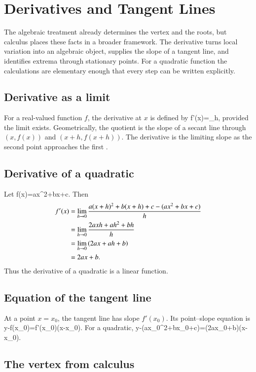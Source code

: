 \section{Derivatives and Tangent Lines}

The algebraic treatment already determines the vertex and the roots, but calculus places these facts in a broader framework. The derivative turns local variation into an algebraic object, supplies the slope of a tangent line, and identifies extrema through stationary points. For a quadratic function the calculations are elementary enough that every step can be written explicitly.

\subsection{Derivative as a limit}

For a real-valued function $f$, the derivative at $x$ is defined by
\be
f'(x)=\lim_{h},
\ee
provided the limit exists. Geometrically, the quotient is the slope of a secant line through $(x,f(x))$ and $(x+h,f(x+h))$. The derivative is the limiting slope as the second point approaches the first \cite{apostol1967,spivak2008}.

\subsection{Derivative of a quadratic}

Let
\be
f(x)=ax^2+bx+c.
\ee
Then
\begin{align}
f'(x)
&=\lim_{h\to0}\frac{a(x+h)^2+b(x+h)+c-(ax^2+bx+c)}{h}\\
&=\lim_{h\to0}\frac{2axh+ah^2+bh}{h}\\
&=\lim_{h\to0}\left(2ax+ah+b\right)\\
&=2ax+b.
\lb{eq:quadratic_derivative}
\end{align}
Thus the derivative of a quadratic is a linear function.

\subsection{Equation of the tangent line}

At a point $x=x_0$, the tangent line has slope $f'(x_0)$. Its point--slope equation is
\be
y-f(x_0)=f'(x_0)(x-x_0).
\ee
For a quadratic,
\be
y-(ax_0^2+bx_0+c)=(2ax_0+b)(x-x_0).
\ee

\subsection{The vertex from calculus}

